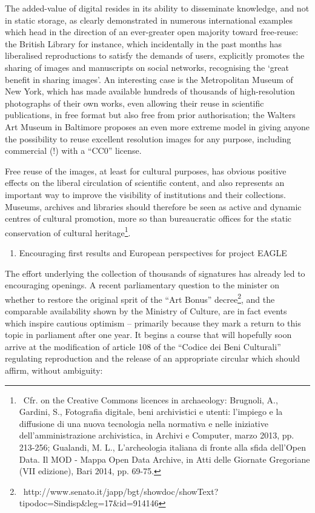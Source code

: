 \documentclass[amsthm,ebook]{saparticle}
\begin{document}
The added-value of digital resides in its ability to disseminate knowledge, and not in static storage, as clearly
demonstrated in numerous international examples which head in the direction of an ever-greater open majority toward
free-reuse: the British Library for instance, which incidentally in the past months has liberalised reproductions to
satisfy the demands of users, explicitly promotes the sharing of images and manuscripts on social networks, recognising
the ‘great benefit in sharing images’. An interesting case is the Metropolitan Museum of New York, which has made
available hundreds of thousands of high-resolution photographs of their own works, even allowing their reuse in
scientific publications, in free format but also free from prior authorisation; the Walters Art Museum in Baltimore
proposes an even more extreme model in giving anyone the possibility to reuse excellent resolution images for any
purpose, including commercial (!) with a “CC0” license.

Free reuse of the images, at least for cultural purposes, has obvious positive effects on the liberal circulation of
scientific content, and also represents an important way to improve the visibility of institutions and their
collections. Museums, archives and libraries should therefore be seen as active and dynamic centres of cultural
promotion, more so than bureaucratic offices for the static conservation of cultural heritage\footnote{\ Cfr. on the
Creative Commons licences in archaeology: Brugnoli, A., Gardini, S., Fotografia digitale, beni archivistici e utenti:
l’impiego e la diffusione di una nuova tecnologia nella normativa e nelle iniziative dell’amministrazione archivistica,
in Archivi e Computer, marzo 2013, pp. 213-256; Gualandi, M. L., L’archeologia italiana di fronte alla sfida dell'Open
Data. Il MOD - Mappa Open Data Archive, in Atti delle Giornate Gregoriane (VII edizione), Bari 2014, pp. 69-75.}.


\bigskip

\begin{enumerate}
\item Encouraging first results and European perspectives for project EAGLE
\end{enumerate}
The effort underlying the collection of thousands of signatures has already led to encouraging openings. A recent
parliamentary question to the minister on whether to restore the original sprit of the “Art Bonus”
decree\footnote{\ http://www.senato.it/japp/bgt/showdoc/showText?tipodoc=Sindisp\&leg=17\&id=914146}, and the
comparable availability shown by the Ministry of Culture, are in fact events which inspire cautious optimism –
primarily because they mark a return to this topic in parliament after one year. It begins a course that will hopefully
soon arrive at the modification of article 108 of the “Codice dei Beni Culturali” regulating reproduction and the
release of an appropriate circular which should affirm, without ambiguity:
\end{document}
